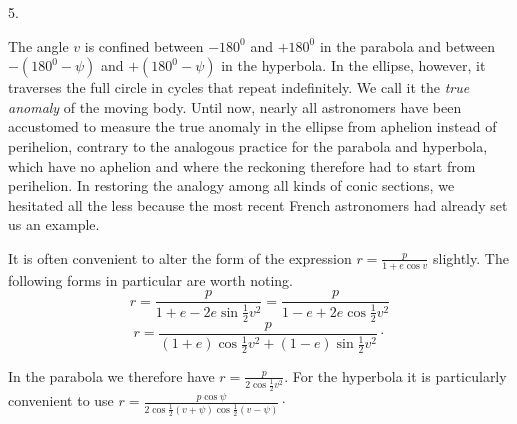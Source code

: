 \par{}
\begin{center}
5.
\end{center}
The angle $v$ is confined between $-180^0$ and $+180^0$ in the parabola and between $-(180^0-\psi)$ and $+(180^0-\psi)$ in the hyperbola. In the ellipse, however, it traverses the full circle in cycles that repeat indefinitely. We call it the \emph{true anomaly} of the moving body. Until now, nearly all astronomers have been accustomed to measure the true anomaly in the ellipse from aphelion instead of perihelion, contrary to the analogous practice for the parabola and hyperbola, which have no aphelion and where the reckoning therefore had to start from perihelion. In restoring the analogy among all kinds of conic sections,
we hesitated all the less because the most recent French astronomers had already set us an example.

It is often convenient to alter the form of the expression $r = \frac{p}{1+e\cos v}$ slightly. The following forms in particular are worth noting.
\[
r = \frac{p}{1+e-2e\sin\frac{1}{2}v^2} = \frac{p}{1-e+2e\cos\frac{1}{2}v^2}
\]
\[
r = \frac{p}{(1+e)\cos\frac{1}{2}v^2+(1-e)\sin\frac{1}{2}v^2}\cdot
\]

In the parabola we therefore have $r = \frac{p}{2\cos\frac{1}{2}v^2}$. For the hyperbola it is particularly convenient to use $r = \frac{p\cos\psi}{2\cos\frac{1}{2}(v+\psi)\cos\frac{1}{2}(v-\psi)}\cdot$
